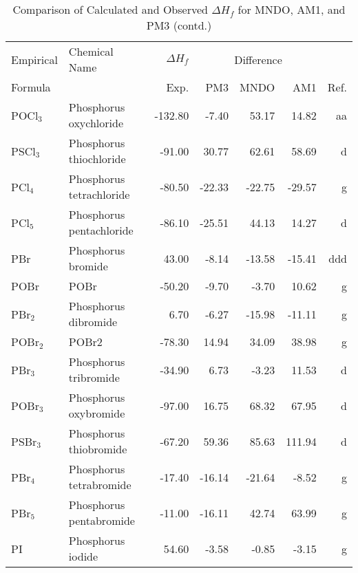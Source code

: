 \begin{table}
\caption{Comparison of Calculated and Observed $\Delta H_f$ 
for MNDO, AM1, and PM3 (contd.)}
\begin{center}
\compresstable
\begin{tabular}{llrrrrr}
Empirical & Chemical Name & $\Delta H_f$ & \multicolumn{3}{c}{Difference} & \\
Formula   &               & Exp. & PM3 &  MNDO  &  AM1 &     Ref.\\
\hline
 POCl$_3$       & Phosphorus oxychloride                 &  -132.80    &    -7.40  &    53.17  &    14.82  &     aa\\
 PSCl$_3$       & Phosphorus thiochloride                &   -91.00    &    30.77  &    62.61  &    58.69  &      d\\
 PCl$_4$        & Phosphorus tetrachloride               &   -80.50    &   -22.33  &   -22.75  &   -29.57  &      g\\
 PCl$_5$        & Phosphorus pentachloride               &   -86.10    &   -25.51  &    44.13  &    14.27  &      d\\
 PBr         & Phosphorus bromide                     &    43.00    &    -8.14  &   -13.58  &   -15.41  &    ddd\\
 POBr        & POBr                                   &   -50.20    &    -9.70  &    -3.70  &    10.62  &      g\\
 PBr$_2$        & Phosphorus dibromide                   &     6.70    &    -6.27  &   -15.98  &   -11.11  &      g\\
 POBr$_2$       & POBr2                                  &   -78.30    &    14.94  &    34.09  &    38.98  &      g\\
 PBr$_3$        & Phosphorus tribromide                  &   -34.90    &     6.73  &    -3.23  &    11.53  &      d\\
 POBr$_3$       & Phosphorus oxybromide                  &   -97.00    &    16.75  &    68.32  &    67.95  &      d\\
 PSBr$_3$       & Phosphorus thiobromide                 &   -67.20    &    59.36  &    85.63  &   111.94  &      d\\
 PBr$_4$        & Phosphorus tetrabromide                &   -17.40    &   -16.14  &   -21.64  &    -8.52  &      g\\
 PBr$_5$        & Phosphorus pentabromide                &   -11.00    &   -16.11  &    42.74  &    63.99  &      g\\
 PI          & Phosphorus iodide                      &    54.60    &    -3.58  &    -0.85  &    -3.15  &      g\\

\end{tabular}
\end{center}
\end{table}
